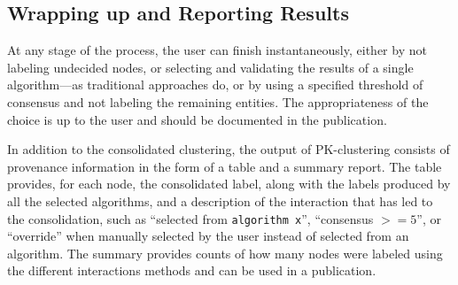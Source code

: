 


\subsection {Wrapping up and Reporting Results}

At any stage of the process, the user can finish instantaneously, either by not labeling undecided nodes, or selecting and validating the results of a single algorithm---as traditional approaches do, or by using a specified threshold of consensus and not labeling the remaining entities. The appropriateness of the choice is up to the user and should be documented in the publication.

In addition to the consolidated clustering, the output of PK-clustering consists of provenance information in the form of a table and a summary report.
The table provides, for each node, the consolidated label, along with the labels produced by all the selected algorithms, and a description of the interaction that has led to the consolidation, such as ``selected from \verb|algorithm x|'', ``consensus $>= 5$'', or ``override'' when manually selected by the user instead of selected from an algorithm.  The summary provides counts of how many nodes were labeled using the different interactions methods and can be used in a publication.

